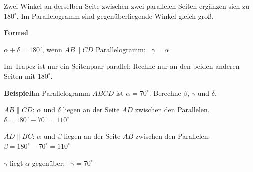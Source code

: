 \documentclass[11pt]{article}
\begin{document}
\clearpage\label{s:D}\noindent\colorbox{black!12}{}\hspace{3mm}{\Large\bfseries Parallelogramm und Trapez}\par\smallskip
\noindent Zwei Winkel an derselben Seite zwischen zwei parallelen Seiten ergänzen sich zu $180^\circ$. Im Parallelogramm sind gegenüberliegende Winkel gleich groß.\par\medskip
\noindent\textbf{Formel}\par\nopagebreak\noindent\hspace*{4mm}\begin{minipage}{\dimexpr\linewidth-4mm\relax}$\alpha + \delta = 180^\circ$, wenn $AB \parallel CD$ \qquad Parallelogramm: \ $\gamma = \alpha$\par {\small Im Trapez ist nur ein Seitenpaar parallel: Rechne nur an den beiden anderen Seiten mit $180^\circ$.}\end{minipage}\par\medskip
\noindent\textbf{Beispiel}\quad Im Parallelogramm $ABCD$ ist $\alpha = 70^\circ$. Berechne $\beta$, $\gamma$ und $\delta$.\par\smallskip
\noindent\begin{minipage}[t]{0.6\linewidth}\vspace{0pt}\par\noindent{}$AB \parallel CD$: $\alpha$ und $\delta$ liegen an der Seite $AD$ zwischen den Parallelen. \ $\delta = 180^\circ - 70^\circ = 110^\circ$\par\smallskip\par\noindent{}$AD \parallel BC$: $\alpha$ und $\beta$ liegen an der Seite $AB$ zwischen den Parallelen. \ $\beta = 180^\circ - 70^\circ = 110^\circ$\par\smallskip\par\noindent{}$\gamma$ liegt $\alpha$ gegenüber: \ $\gamma = 70^\circ$\par\smallskip\end{minipage}\hfill
\end{document}
